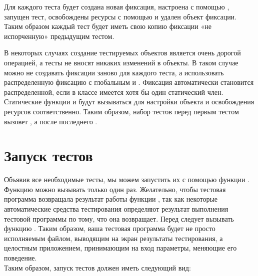 \documentclass[a4paper, 11pt]{article}
\begin{document}
	Для каждого теста будет создана новая фиксация, настроена с помощью , запущен тест, освобождены ресурсы с помощью  и удален объект фиксации. Таким образом каждый тест будет иметь свою копию фиксации «не испорченную» предыдущим тестом.
	
	
	В некоторых случаях создание тестируемых объектов является очень дорогой операцией, а тесты не вносят никаких изменений в объекты. В таком случае можно не создавать фиксации заново для каждого теста, а использовать распределенную фиксацию с глобальным и . Фиксация автоматически становится распределенной, если в классе имеется хотя бы один статический член. Статические функции  и  будут вызываться для настройки объекта и освобождения ресурсов соответственно. Таким образом, набор тестов перед первым тестом вызовет , а после последнего .
	
	
	\section{Запуск тестов}
	
	Объявив все необходимые тесты, мы можем запустить их с помощью функции . Функцию можно вызывать только один раз. Желательно, чтобы тестовая программа возвращала результат работы функции , так как некоторые автоматические средства тестирования определяют результат выполнения тестовой программы по тому, что она возвращает. Перед  следует вызывать функцию . Таким образом, ваша тестовая программа будет не просто исполняемым файлом, выводящим на экран результаты тестирования, а целостным приложением, принимающим на вход параметры, меняющие его поведение.\\
	
	Таким образом, запуск тестов должен иметь следующий вид:
	
\end{document}

